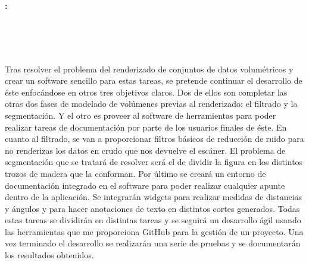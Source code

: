 \chapter*{}



\cleardoublepage
\thispagestyle{empty}

\begin{center}
{\large\bfseries \myTitle: \mySubtitle}\\
\end{center}

\begin{center}
\myName \\
\end{center}

\vspace{0.7cm}
\\

\vspace{0.7cm}
\\

Tras resolver el problema del renderizado de conjuntos de datos volumétricos y crear un software sencillo para estas tareas, se pretende continuar el desarrollo de éste enfocándose en otros tres objetivos claros. Dos de ellos son completar las otras dos fases de modelado de volúmenes previas al renderizado: el filtrado y la segmentación. Y el otro es proveer al software de herramientas para poder realizar tareas de documentación por parte de los usuarios finales de éste. En cuanto al filtrado, se van a proporcionar filtros básicos de reducción de ruido para no renderizas los datos en crudo que nos devuelve el escáner. El problema de segmentación que se tratará de resolver será el de dividir la figura en los distintos trozos de madera que la conforman. Por último se creará un entorno de documentación integrado en el software para poder realizar cualquier apunte dentro de la aplicación. Se integrarán widgets para realizar medidas de distancias y ángulos y para hacer anotaciones de texto en distintos cortes generados. Todas estas tareas se dividirán en distintas tareas y se seguirá un desarrollo ágil usando las herramientas que me proporciona GitHub para la gestión de un proyecto. Una vez terminado el desarrollo se realizarán una serie de pruebas y se documentarán los resultados obtenidos.

